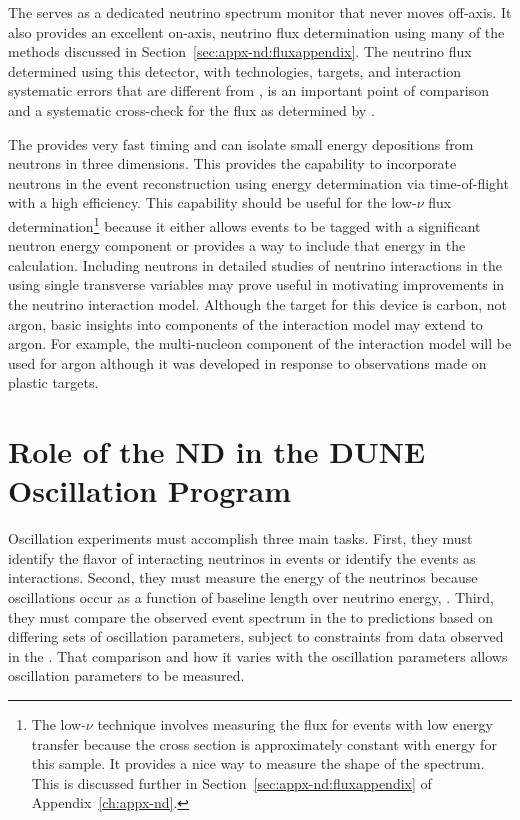 The  serves as a dedicated neutrino spectrum monitor that never moves off-axis. %
It also provides an excellent on-axis, neutrino flux determination using many of the methods discussed in Section~\ref{sec:appx-nd:fluxappendix}. 
The neutrino flux determined using this detector, with  %
technologies, targets, and interaction systematic errors that are different from , is an important point of comparison and a systematic cross-check for the flux as determined by .



The  provides very fast timing and can isolate small energy depositions from neutrons in three dimensions.  This provides the capability to  incorporate neutrons in the event reconstruction using energy determination via time-of-flight with a high efficiency. This capability should be useful for the low-$\nu$ flux determination\footnote{The low-$\nu$ technique involves measuring the flux for events with low energy transfer because the cross section is approximately constant with energy for this sample.  It provides a nice way to measure the shape of the spectrum.  This is discussed further in Section~\ref{sec:appx-nd:fluxappendix} of Appendix~\ref{ch:appx-nd}.} because it either allows events to be tagged with a significant neutron energy component or provides a way to include that energy in the calculation.  Including neutrons in detailed studies of neutrino interactions in the  using single transverse variables may prove useful in motivating improvements in the neutrino interaction model. Although the target for this device is carbon, not argon, basic insights into components of the interaction model may extend to argon.  For example, the multi-nucleon component of the interaction model will be used for argon although it was developed in response to observations made on plastic targets.   



\section{Role of the ND in the DUNE Oscillation Program}
\label{sec:exsum-nd-role}

Oscillation experiments must accomplish three main tasks. First, they must identify the flavor of interacting neutrinos in  events or identify the events as  interactions. Second, they must measure the energy of the neutrinos because oscillations occur as a function of baseline length over neutrino energy, . Third, they must compare the observed event spectrum in the  to  predictions based on differing sets of oscillation parameters, subject to constraints from data observed in the .  That comparison and how it varies with the oscillation parameters allows oscillation parameters to be measured.


